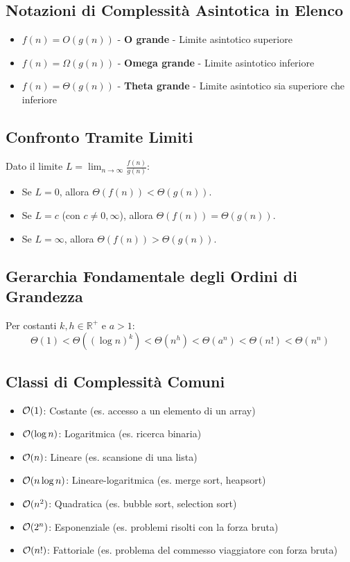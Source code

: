 \subsection*{Notazioni di Complessità Asintotica in Elenco}

\begin{itemize}
    \item $f(n) = O(g(n))$ - \textbf{O grande} - Limite asintotico superiore
    \item $f(n) = \Omega(g(n))$ - \textbf{Omega grande} - Limite asintotico inferiore
    \item $f(n) = \Theta(g(n))$ - \textbf{Theta grande} - Limite asintotico sia superiore che inferiore
\end{itemize}

\subsection*{Confronto Tramite Limiti}
Dato il limite $L = \lim_{n\to\infty} \frac{f(n)}{g(n)}$:
\begin{itemize}
    \item Se $L = 0$, allora $\Theta(f(n)) < \Theta(g(n))$.
    \item Se $L = c$ (con $c \neq 0, \infty$), allora $\Theta(f(n)) = \Theta(g(n))$.
    \item Se $L = \infty$, allora $\Theta(f(n)) > \Theta(g(n))$.
\end{itemize}

\subsection*{Gerarchia Fondamentale degli Ordini di Grandezza}
Per costanti $k,h \in \mathbb{R}^+$ e $a>1$:
$$ \Theta(1) < \Theta((\log n)^{k}) < \Theta(n^{h}) < \Theta(a^{n}) < \Theta(n!) < \Theta(n^{n})$$

\subsection*{Classi di Complessità Comuni}
\begin{itemize}
    \item $\mathcal{O}(1)$: Costante (es. accesso a un elemento di un array)
    \item $\mathcal{O}(\log n)$: Logaritmica (es. ricerca binaria)
    \item $\mathcal{O}(n)$: Lineare (es. scansione di una lista)
    \item $\mathcal{O}(n \log n)$: Lineare-logaritmica (es. merge sort, heapsort)
    \item $\mathcal{O}(n^2)$: Quadratica (es. bubble sort, selection sort)
    \item $\mathcal{O}(2^n)$: Esponenziale (es. problemi risolti con la forza bruta)
    \item $\mathcal{O}(n!)$: Fattoriale (es. problema del commesso viaggiatore con forza bruta)
\end{itemize}

